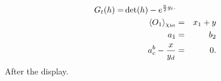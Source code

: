 \documentclass{article}
\begin{document}
\begin{eqnarray*}
G_t(h)=}\det(h)-e^{\frac{a}{2}g_t. \\
\langle{O}_1}\rangle_{\chi_{b0} &=& {x}_1}+{y \\
a_1 &=& b_2 \\
a^{b}_c} - \frac{x}{y_{d}&=& 0.
\end{eqnarray*}
After the display.
\end{document}
